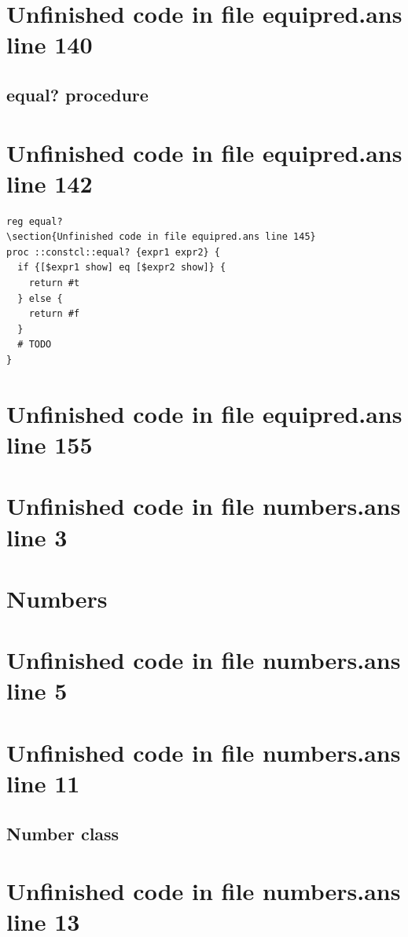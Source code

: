 \documentclass[twoside,9pt]{report}
\begin{document}
\section{Unfinished code in file equipred.ans line 140}
\subsection{equal? procedure}
\label{equal?-procedure}
\section{Unfinished code in file equipred.ans line 142}
\begin{lstlisting}
reg equal?
\section{Unfinished code in file equipred.ans line 145}
proc ::constcl::equal? {expr1 expr2} {
  if {[$expr1 show] eq [$expr2 show]} {
    return #t
  } else {
    return #f
  }
  # TODO
}
\end{lstlisting}
\section{Unfinished code in file equipred.ans line 155}
\section{Unfinished code in file numbers.ans line 3}
\section{Numbers}
\label{numbers}
\section{Unfinished code in file numbers.ans line 5}

\section{Unfinished code in file numbers.ans line 11}
\subsection{Number class}
\label{number-class}
\section{Unfinished code in file numbers.ans line 13}
\end{document}
